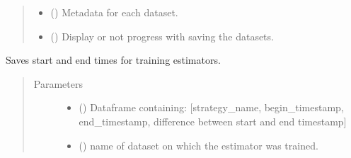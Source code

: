 \documentclass[letterpaper,10pt,english]{sphinxmanual}
\begin{document}
\begin{fulllineitems}
\begin{fulllineitems}
\begin{quote}
\begin{description}
\begin{itemize}
\item {} 
 () \textendash{} Metadata for each dataset.

\item {} 
 () \textendash{} Display or not progress with saving the datasets.

\end{itemize}

\end{description}\end{quote}

\end{fulllineitems}


\begin{fulllineitems}
\label{\detokenize{shared:mleap.shared.files_io.FilesIO.save_ml_strategy_timestamps}}
Saves start and end times for training estimators.
\begin{quote}\begin{description}
\item[{Parameters}] \leavevmode\begin{itemize}
\item {} 
 () \textendash{} Dataframe containing: {[}strategy\_name, 
begin\_timestamp, 
end\_timestamp,
difference between start and end timestamp{]}

\item {} 
 () \textendash{} name of dataset on which the estimator was trained.

\end{itemize}

\end{description}\end{quote}

\end{fulllineitems}



\end{fulllineitems}
\end{document}
